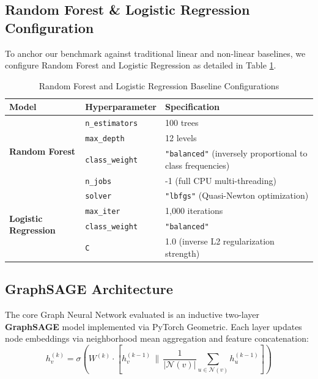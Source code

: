 \documentclass[11pt,a4paper]{report}
\begin{document}
\subsection{Random Forest \& Logistic Regression Configuration}
To anchor our benchmark against traditional linear and non-linear baselines, we configure Random Forest and Logistic Regression as detailed in Table \ref{tab:baseline_params}.

\begin{table}[H]
\centering
\caption{Random Forest and Logistic Regression Baseline Configurations}
\label{tab:baseline_params}
\begin{tabular}{lll}
\toprule
\textbf{Model} & \textbf{Hyperparameter} & \textbf{Specification} \\
\midrule
\multirow{4}{*}{\textbf{Random Forest}} 
 & \texttt{n\_estimators} & 100 trees \\
 & \texttt{max\_depth} & 12 levels \\
 & \texttt{class\_weight} & \texttt{"balanced"} (inversely proportional to class frequencies) \\
 & \texttt{n\_jobs} & -1 (full CPU multi-threading) \\
\midrule
\multirow{4}{*}{\textbf{Logistic Regression}}
 & \texttt{solver} & \texttt{"lbfgs"} (Quasi-Newton optimization) \\
 & \texttt{max\_iter} & 1,000 iterations \\
 & \texttt{class\_weight} & \texttt{"balanced"} \\
 & \texttt{C} & 1.0 (inverse L2 regularization strength) \\
\bottomrule
\end{tabular}
\end{table}

\subsection{GraphSAGE Architecture}
The core Graph Neural Network evaluated is an inductive two-layer \textbf{GraphSAGE} model \cite{hamilton2017inductive} implemented via PyTorch Geometric. Each layer updates node embeddings via neighborhood mean aggregation and feature concatenation:
\begin{equation}
h_v^{(k)} = \sigma \left( W^{(k)} \cdot \left[ h_v^{(k-1)} \,\|\, \frac{1}{|\mathcal{N}(v)|} \sum_{u \in \mathcal{N}(v)} h_u^{(k-1)} \right] \right)
\end{equation}
\end{document}

